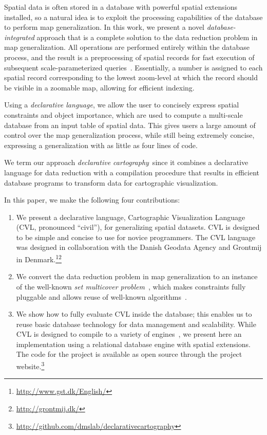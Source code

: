 \documentclass[11pt, oneside]{report}
\begin{document}
{Spatial data is often stored in a database with powerful spatial extensions installed, so a natural idea is to exploit the processing capabilities of the database to perform map generalization. In this work, we present a novel \emph{database-integrated} approach that is a complete solution to the data reduction problem in map generalization. All operations are performed entirely within the database process, and the result is a preprocessing of spatial records for fast execution of subsequent scale-parameterized queries~\cite{hilbert1891ueber}. Essentially, a number is assigned to each spatial record corresponding to the lowest zoom-level at which the record should be visible in a zoomable map, allowing for efficient indexing.

Using a \emph{declarative language}, we allow the user to concisely express spatial constraints and object importance, which are used to compute a multi-scale database from an input table of spatial data. This gives users a large amount of control over the map generalization process, while still being extremely concise, expressing a generalization with as little as four lines of code. 

We term our approach \emph{declarative cartography}\, since it combines a declarative language for data reduction with a compilation procedure that results in efficient database programs to transform data for cartographic visualization.

In this paper, we make the following four contributions:
\begin{enumerate}
\item We present a declarative language, Cartographic Visualization Language (CVL, pronounced ``civil''), for generalizing spatial datasets. CVL is designed to be simple and concise to use for novice programmers. The CVL language was designed in collaboration with the Danish Geodata Agency and Grontmij in Denmark.\footnote{\url{http://www.gst.dk/English/}}\footnote{\url{http://grontmij.dk/}}

\item We convert the data reduction problem in map generalization to an instance of the well-known \emph{set multicover problem}~\cite{rajagopalan1998primal}, which makes constraints fully pluggable and allows reuse of well-known algorithms~\cite{rajagopalan1998primal,vazirani2001approximation}.

\item We show how to fully evaluate CVL inside the database; this enables us to reuse basic database technology for data management and scalability. While CVL is designed to compile to a variety of engines~\cite{Stonebraker:2010:PDBMSvsMapReduce}, we present here an implementation using a relational database engine with spatial extensions. The code for the project is available as open source through the project website.\footnote{\url{http://github.com/dmslab/declarativecartography}}


\end{enumerate}}
\end{document}
